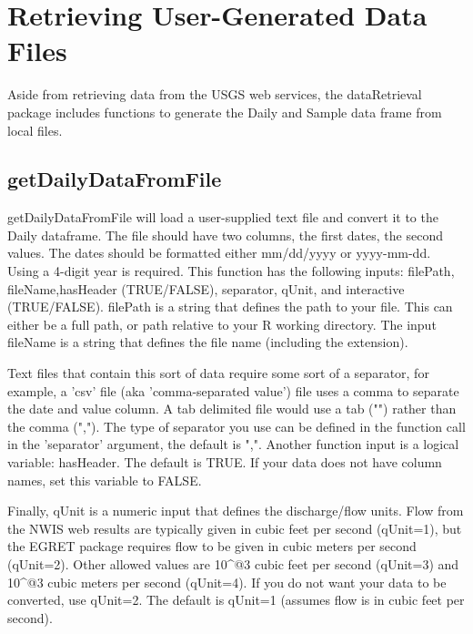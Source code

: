 \documentclass[a4paper,11pt]{article}
\begin{document}
\newpage
\section{Retrieving User-Generated Data Files}
Aside from retrieving data from the USGS web services, the dataRetrieval package includes functions to generate the Daily and Sample data frame from local files.

\subsection{getDailyDataFromFile}
getDailyDataFromFile will load a user-supplied text file and convert it to the Daily dataframe. The file should have two columns, the first dates, the second values.  The dates should be formatted either mm/dd/yyyy or yyyy-mm-dd. Using a 4-digit year is required. This function has the following inputs: filePath, fileName,hasHeader (TRUE/FALSE), separator, qUnit, and interactive (TRUE/FALSE). filePath is a string that defines the path to your file. This can either be a full path, or path relative to your R working directory. The input fileName is a string that defines the file name (including the extension).

Text files that contain this sort of data require some sort of a separator, for example, a 'csv' file (aka 'comma-separated value') file uses a comma to separate the date and value column. A tab delimited file would use a tab ("\verb@\t@") rather than the comma (","). The type of separator you use can be defined in the function call in the 'separator' argument, the default is ",". Another function input is a logical variable: hasHeader.  The default is TRUE. If your data does not have column names, set this variable to FALSE.

Finally, qUnit is a numeric input that defines the discharge/flow units. Flow from the NWIS web results are typically given in cubic feet per second (qUnit=1), but the EGRET package requires flow to be given in cubic meters per second (qUnit=2). Other allowed values are 10\verb@^@3 cubic feet per second (qUnit=3) and 10\verb@^@3 cubic meters per second (qUnit=4). If you do not want your data to be converted, use qUnit=2. The default is qUnit=1 (assumes flow is in cubic feet per second).
\end{document}
